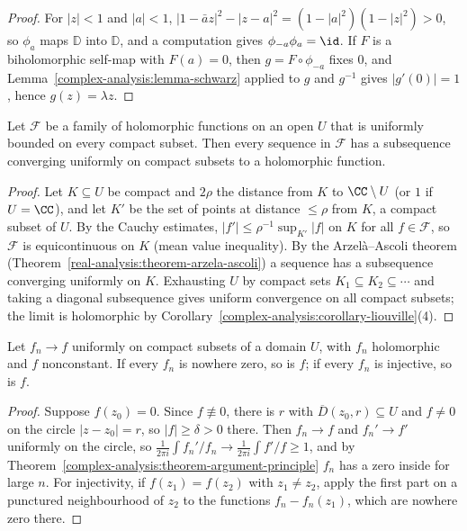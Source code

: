 \begin{proof}
For $|z| < 1$ and $|a| < 1$, $|1 - \bar az|^2 - |z - a|^2 = (1 - |a|^2)(1 - |z|^2) > 0$, so $\phi_a$ maps $\mathbb{D}$ into $\mathbb{D}$, and a computation gives $\phi_{-a}\phi_a = \id$. If $F$ is a biholomorphic
self-map with $F(a) = 0$, then $g = F \circ \phi_{-a}$ fixes $0$, and Lemma~\ref{complex-analysis:lemma-schwarz} applied to $g$ and $g^{-1}$ gives $|g'(0)| = 1$, hence $g(z) = \lambda z$.
\end{proof}

\begin{theorem}[Montel]\label{complex-analysis:theorem-montel}
Let $\mathcal{F}$ be a family of holomorphic functions on an open $U$ that is uniformly bounded on every compact subset. Then every sequence in $\mathcal{F}$ has a subsequence converging uniformly on compact
subsets to a holomorphic function.
\end{theorem}

\begin{proof}
Let $K \subseteq U$ be compact and $2\rho$ the distance from $K$ to $\CC \setminus U$ (or $1$ if $U = \CC$), and let $K'$ be the set of points at distance $\leq \rho$ from $K$, a compact subset of $U$. By the
Cauchy estimates, $|f'| \leq \rho^{-1}\sup_{K'}|f|$ on $K$ for all $f \in \mathcal{F}$, so $\mathcal{F}$ is equicontinuous on $K$ (mean value inequality). By the Arzel\`a--Ascoli theorem
(Theorem~\ref{real-analysis:theorem-arzela-ascoli}) a sequence has a subsequence converging uniformly on $K$. Exhausting $U$ by compact sets $K_1 \subseteq K_2 \subseteq \cdots$ and taking a diagonal
subsequence gives uniform convergence on all compact subsets; the limit is holomorphic by Corollary~\ref{complex-analysis:corollary-liouville}(4).
\end{proof}

\begin{theorem}[Hurwitz]\label{complex-analysis:theorem-hurwitz}
Let $f_n \to f$ uniformly on compact subsets of a domain $U$, with $f_n$ holomorphic and $f$ nonconstant. If every $f_n$ is nowhere zero, so is $f$; if every $f_n$ is injective, so is $f$.
\end{theorem}

\begin{proof}
Suppose $f(z_0) = 0$. Since $f \not\equiv 0$, there is $r$ with $\overline{D}(z_0, r) \subseteq U$ and $f \neq 0$ on the circle $|z - z_0| = r$, so $|f| \geq \delta > 0$ there. Then $f_n \to f$ and $f_n' \to f'$
uniformly on the circle, so $\frac{1}{2\pi i}\int f_n'/f_n \to \frac{1}{2\pi i}\int f'/f \geq 1$, and by Theorem~\ref{complex-analysis:theorem-argument-principle} $f_n$ has a zero inside for large $n$. For
injectivity, if $f(z_1) = f(z_2)$ with $z_1 \neq z_2$, apply the first part on a punctured neighbourhood of $z_2$ to the functions $f_n - f_n(z_1)$, which are nowhere zero there.
\end{proof}

